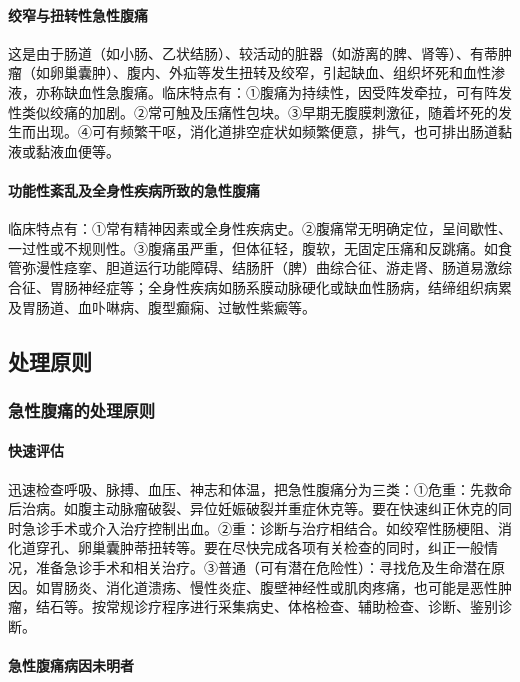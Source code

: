 \paragraph{绞窄与扭转性急性腹痛}

这是由于肠道（如小肠、乙状结肠）、较活动的脏器（如游离的脾、肾等）、有蒂肿瘤（如卵巢囊肿）、腹内、外疝等发生扭转及绞窄，引起缺血、组织坏死和血性渗液，亦称缺血性急腹痛。临床特点有：①腹痛为持续性，因受阵发牵拉，可有阵发性类似绞痛的加剧。②常可触及压痛性包块。③早期无腹膜刺激征，随着坏死的发生而出现。④可有频繁干呕，消化道排空症状如频繁便意，排气，也可排出肠道黏液或黏液血便等。

\paragraph{功能性紊乱及全身性疾病所致的急性腹痛}

临床特点有：①常有精神因素或全身性疾病史。②腹痛常无明确定位，呈间歇性、一过性或不规则性。③腹痛虽严重，但体征轻，腹软，无固定压痛和反跳痛。如食管弥漫性痉挛、胆道运行功能障碍、结肠肝（脾）曲综合征、游走肾、肠道易激综合征、胃肠神经症等；全身性疾病如肠系膜动脉硬化或缺血性肠病，结缔组织病累及胃肠道、血卟啉病、腹型癫痫、过敏性紫癜等。

\subsection{处理原则}

\subsubsection{急性腹痛的处理原则}

\paragraph{快速评估}

迅速检查呼吸、脉搏、血压、神志和体温，把急性腹痛分为三类：①危重：先救命后治病。如腹主动脉瘤破裂、异位妊娠破裂并重症休克等。要在快速纠正休克的同时急诊手术或介入治疗控制出血。②重：诊断与治疗相结合。如绞窄性肠梗阻、消化道穿孔、卵巢囊肿蒂扭转等。要在尽快完成各项有关检查的同时，纠正一般情况，准备急诊手术和相关治疗。③普通（可有潜在危险性）：寻找危及生命潜在原因。如胃肠炎、消化道溃疡、慢性炎症、腹壁神经性或肌肉疼痛，也可能是恶性肿瘤，结石等。按常规诊疗程序进行采集病史、体格检查、辅助检查、诊断、鉴别诊断。

\paragraph{急性腹痛病因未明者}

